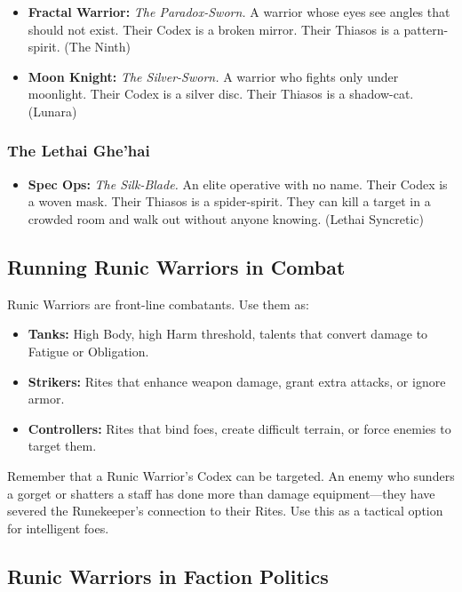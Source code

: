 \begin{itemize}
\item \textbf{Fractal Warrior:} \textit{The Paradox-Sworn.} A warrior whose eyes see angles that should not exist. Their Codex is a broken mirror. Their Thiasos is a pattern-spirit. (The Ninth)
\item \textbf{Moon Knight:} \textit{The Silver-Sworn.} A warrior who fights only under moonlight. Their Codex is a silver disc. Their Thiasos is a shadow-cat. (Lunara)
\end{itemize}

\subsubsection{The Lethai Ghe'hai}

\begin{itemize}
\item \textbf{Spec Ops:} \textit{The Silk-Blade.} An elite operative with no name. Their Codex is a woven mask. Their Thiasos is a spider-spirit. They can kill a target in a crowded room and walk out without anyone knowing. (Lethai Syncretic)
\end{itemize}

\subsection{Running Runic Warriors in Combat}

Runic Warriors are front-line combatants. Use them as:

\begin{itemize}
\item \textbf{Tanks:} High Body, high Harm threshold, talents that convert damage to Fatigue or Obligation.
\item \textbf{Strikers:} Rites that enhance weapon damage, grant extra attacks, or ignore armor.
\item \textbf{Controllers:} Rites that bind foes, create difficult terrain, or force enemies to target them.
\end{itemize}

Remember that a Runic Warrior's Codex can be targeted. An enemy who sunders a gorget or shatters a staff has done more than damage equipment—they have severed the Runekeeper's connection to their Rites. Use this as a tactical option for intelligent foes.

\subsection{Runic Warriors in Faction Politics}

